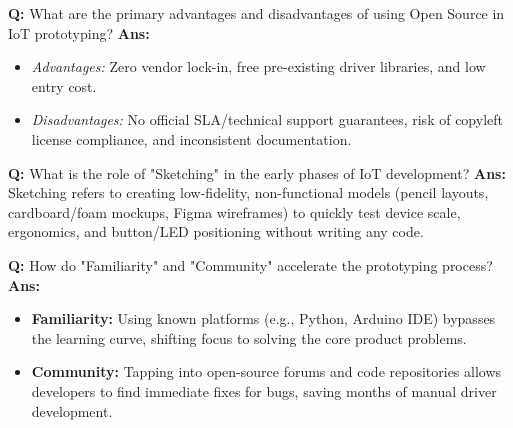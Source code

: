 \documentclass[10pt,a4paper,twocolumn]{article}
\begin{document}
\begin{tcolorbox}[
  colback=white,
  colframe=UnitColorFour,
  colbacktitle=gray!10!white,
  coltitle=black,
  fonttitle=\bfseries\sffamily\small,
  title={Unit IV $\bullet$ Card 6},
  boxrule=1.2pt,
  arc=2mm,
  outer arc=2mm,
  boxsep=1.5mm,
  top=1mm,
  bottom=1mm,
  left=1.5mm,
  right=1.5mm,
  before skip=2.5mm,
  after skip=2.5mm
]
\textbf{Q:} What are the primary advantages and disadvantages of using Open Source in IoT prototyping?
\tcbline
\textbf{Ans:} \begin{itemize}
  \item \textit{Advantages:} Zero vendor lock-in, free pre-existing driver libraries, and low entry cost.
  \item \textit{Disadvantages:} No official SLA/technical support guarantees, risk of copyleft license compliance, and inconsistent documentation.
\end{itemize}
\end{tcolorbox}


\begin{tcolorbox}[
  colback=white,
  colframe=UnitColorFour,
  colbacktitle=gray!10!white,
  coltitle=black,
  fonttitle=\bfseries\sffamily\small,
  title={Unit IV $\bullet$ Card 7},
  boxrule=1.2pt,
  arc=2mm,
  outer arc=2mm,
  boxsep=1.5mm,
  top=1mm,
  bottom=1mm,
  left=1.5mm,
  right=1.5mm,
  before skip=2.5mm,
  after skip=2.5mm
]
\textbf{Q:} What is the role of "Sketching" in the early phases of IoT development?
\tcbline
\textbf{Ans:} Sketching refers to creating low-fidelity, non-functional models (pencil layouts, cardboard/foam mockups, Figma wireframes) to quickly test device scale, ergonomics, and button/LED positioning without writing any code.
\end{tcolorbox}


\begin{tcolorbox}[
  colback=white,
  colframe=UnitColorFour,
  colbacktitle=gray!10!white,
  coltitle=black,
  fonttitle=\bfseries\sffamily\small,
  title={Unit IV $\bullet$ Card 8},
  boxrule=1.2pt,
  arc=2mm,
  outer arc=2mm,
  boxsep=1.5mm,
  top=1mm,
  bottom=1mm,
  left=1.5mm,
  right=1.5mm,
  before skip=2.5mm,
  after skip=2.5mm
]
\textbf{Q:} How do "Familiarity" and "Community" accelerate the prototyping process?
\tcbline
\textbf{Ans:} \begin{itemize}
  \item \textbf{Familiarity:} Using known platforms (e.g., Python, Arduino IDE) bypasses the learning curve, shifting focus to solving the core product problems.
  \item \textbf{Community:} Tapping into open-source forums and code repositories allows developers to find immediate fixes for bugs, saving months of manual driver development.
\end{itemize}
\end{tcolorbox}
\end{document}
